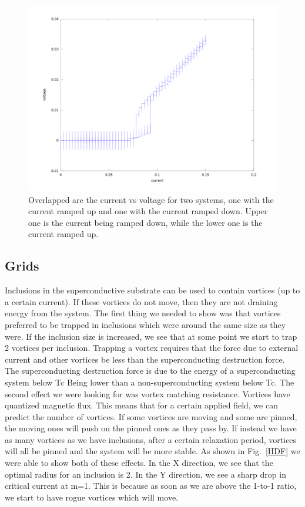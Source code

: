 \begin{figure}[htbp]
\begin{center}
\includegraphics[scale=.50]{JvV.png}
\caption{ Overlapped are the current vs voltage for two systems, one with the current ramped up and one with the current ramped down. Upper one is the current being ramped down, while the lower one is the current ramped up.}
\label{hysteresis}
\end{center}
\end{figure}
 

\subsection{Grids}
Inclusions in the superconductive substrate can be used to contain vortices (up to a certain current). If these vortices do not move, then they are not draining energy from the system. The first thing we needed to show was that vortices preferred to be trapped in inclusions which were around the same size as they were. If the inclusion size is increased, we see that at some point we start to trap 2 vortices per inclusion. Trapping a vortex requires that the force due to external current and other vortices be less than the superconducting destruction force. The superconducting destruction force is due to the energy of a superconducting system below Tc Being lower than a non-superconducting system below Tc. The second effect we were looking for was vortex matching resistance. Vortices have quantized magnetic flux. This means that for a certain applied field, we can predict the number of vortices. If some vortices are moving and some are pinned, the moving ones will push on the pinned ones as they pass by. If instead we have as many vortices as we have inclusions, after a certain relaxation period, vortices will all be pinned and the system will be more stable. As shown in Fig.~\ref{HDF} we were able to show both of these effects. In the X direction, we see that the optimal radius for an inclusion is 2. In the Y direction, we see a sharp drop in critical current at m=1. This is because as soon as we are above the 1-to-1 ratio, we start to have rogue vortices which will move.

